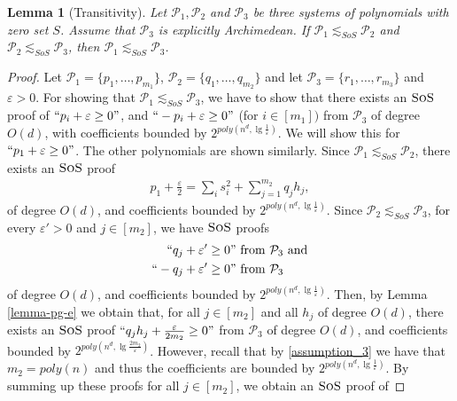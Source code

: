 \documentclass[11pt]{article}
\newcommand{\sos}{\text{\sc{SoS}}}
\newcommand{\1}{\textbf{1}}
\newtheorem{lemma}[theorem]{Lemma}
\begin{document}
\begin{lemma}[Transitivity]\label{th:transitivity_of_approximations}
    Let $\mathcal{P}_1, \mathcal{P}_2$ and $\mathcal{P}_3$ be three systems of polynomials with zero set $S$. Assume that $\mathcal{P}_3$ is explicitly Archimedean. If $\mathcal{P}_1 \lesssim_{SoS} \mathcal{P}_2$ and $\mathcal{P}_2 \lesssim_{SoS} \mathcal{P}_3$, then $\mathcal{P}_1 \lesssim_{SoS} \mathcal{P}_3$.
\end{lemma}
\begin{proof}
     Let $\mathcal{P}_1=\{p_1, \dots, p_{m_1}\}$, $\mathcal{P}_2=\{q_1, \dots, q_{m_2}\}$ and let $\mathcal{P}_3=\{r_1, \dots, r_{m_3}\}$ and $\varepsilon>0$. For showing that $\mathcal{P}_1 \lesssim_{SoS} \mathcal{P}_3$, we have to show that there exists an $\sos$ proof of $``p_i+\varepsilon\geq 0"$, and $``-p_i+\varepsilon\geq0"$ (for $i\in [m_1])$ from $\mathcal{P}_3$ of degree $O(d)$, with coefficients bounded by $2^{poly(n^d,\lg\frac{1}{\varepsilon})}$. We will show this for $``p_1+\varepsilon\geq 0"$. The other polynomials are shown similarly. Since $\mathcal{P}_1 \lesssim_{SoS} \mathcal{P}_2$, there exists an $\sos$ proof
    \begin{align}\label{p_1}
        p_1 + \frac{\varepsilon}{2} = \sum_{i} s_i^2 + \sum_{j=1}^{m_2}q_jh_j,    
    \end{align}
   of degree $O(d)$, and coefficients bounded by $2^{poly(n^d, \lg \frac{1}{\varepsilon})}$. Since $\mathcal{P}_2 \lesssim_{SoS} \mathcal{P}_3$, for every $\varepsilon'>0$ and $j\in[m_2]$, we have $\sos$ proofs
   \begin{align}\label{q_i}
   \begin{split}
    ``q_j + \varepsilon' \geq 0&"  \text{ from }\mathcal{P}_3 \text{  and}\\
    ``-q_j + \varepsilon' \geq 0&" \text{ from } \mathcal{P}_3      
   \end{split}
   \end{align}
    of degree $O(d)$, and coefficients bounded by $2^{poly(n^d, \lg \frac{1}{\varepsilon})}$. Then, by Lemma \ref{lemma-pg-e} we obtain that, for all $j\in [m_2]$ and all $h_j$ of degree $O(d)$, there exists an $\sos$ proof $``q_jh_j + \frac{\varepsilon}{2m_2}\geq 0"$ from $\mathcal{P}_3$ of degree $O(d)$, and coefficients bounded by $2^{poly(n^d, \lg \frac{2m_2}{\varepsilon})}$. However, recall that by \ref{assumption_3} we have that $m_2 = poly(n)$ and thus the coefficients are bounded by $2^{poly(n^d, \lg \frac{1}{\varepsilon})}$. By summing up these proofs for all $j\in [m_2]$, we obtain an $\sos$ proof of

\end{proof}
\end{document}
